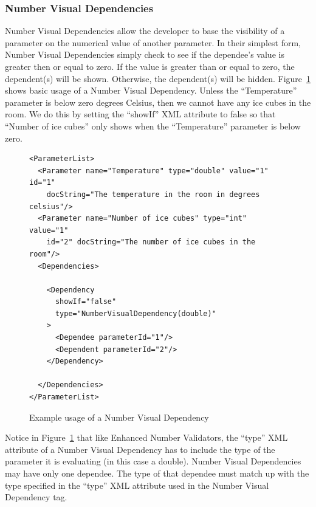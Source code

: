 \subsubsection{Number Visual Dependencies}
Number Visual Dependencies allow the developer to base the visibility of a parameter on the numerical value of another parameter. In their simplest form,
Number Visual Dependencies simply check to see if the dependee's value is greater then or equal to zero. If the value is greater than or equal to zero, the
dependent(s) will be shown. Otherwise, the dependent(s) will be hidden.
Figure~\ref{NumberVisXML1} shows basic usage of a Number Visual Dependency. Unless the ``Temperature'' parameter is below zero degrees
Celsius, then we cannot have any ice cubes in the room. We do this by setting the ``showIf'' XML attribute to false so that ``Number of ice cubes'' only shows
when the ``Temperature'' parameter is below zero.
\begin{figure}
\centering
{\footnotesize
\begin{Verbatim}
<ParameterList>
  <Parameter name="Temperature" type="double" value="1" id="1" 
    docString="The temperature in the room in degrees celsius"/>
  <Parameter name="Number of ice cubes" type="int" value="1"
    id="2" docString="The number of ice cubes in the room"/>
  <Dependencies>

    <Dependency 
      showIf="false" 
      type="NumberVisualDependency(double)"
    >
      <Dependee parameterId="1"/>
      <Dependent parameterId="2"/>
    </Dependency>

  </Dependencies>
</ParameterList>
\end{Verbatim}
}
\caption{Example usage of a Number Visual Dependency}
\label{NumberVisXML1}
\end{figure}

Notice in Figure~\ref{NumberVisXML1} that like Enhanced Number Validators, the ``type'' XML attribute of a Number Visual Dependency has to include the type of the
parameter it is evaluating (in this case a double). Number Visual Dependencies may have only one dependee. The type of that dependee must match up with the
type specified in the ``type'' XML attribute used in the Number Visual Dependency tag.

